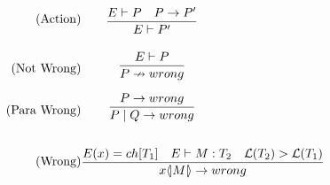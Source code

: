 \begin{align*}
\tag{Action} & \infrule{E \vdash P \quad P\ra P'}{E\vdash P'}\\
\tag{Not Wrong}& \infrule{E \vdash P}{P \nrightarrow wrong}\\
\tag{Para Wrong}& \infrule{P \ra wrong}{P\para Q \ra wrong}\\
\tag{Wrong}& \infrule{E(x) = ch[T_1] \quad E \vdash M:T_2 \quad \level{T_2} > \level{T_1} }{\lift{x}{M} \ra wrong}
\end{align*}


%
%

\FloatBarrier
